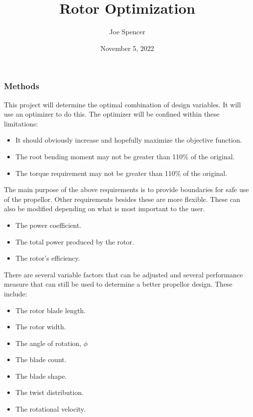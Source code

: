 \documentclass{article}
\begin{document}
\author{Joe Spencer}
\title{Rotor Optimization}
\date{November 5, 2022}
\maketitle

\subsubsection*{Methods}

This project will determine the optimal combination of design variables. It will use an optimizer to do this. The optimizer will be confined within these limitations:

\begin{itemize}
	\item It should obviously increase and hopefully maximize the objective function.
	\item The root bending moment may not be greater than 110\% of the original.
	\item The torque requirement may not be greater than 110\% of the original.
\end{itemize}

The main purpose of the above requirements is to provide boundaries for safe use of the propellor. Other requirements besides these are more flexible. These can also be modified depending on what is most important to the user.

\begin{itemize}
	\item The power coefficient.
	\item The total power produced by the rotor.
	\item The rotor's efficiency.
\end{itemize}

There are several variable factors that can be adjusted and several performance measure that can still be used to determine a better propellor design. These include:

\begin{itemize}
	\item The rotor blade length.
	\item The rotor width.
	\item The angle of rotation, $\phi$
	\item The blade count.
	\item The blade shape.
	\item The twist distribution.
	\item The rotational velocity.
\end{itemize}
\end{document}
